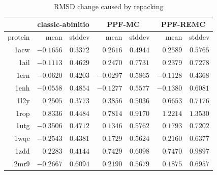\begin{table}
  \centering
  \begin{tabular}{r|r|c||r|c||r|c}
            & \multicolumn{2}{c}{classic-abinitio} & \multicolumn{2}{||c}{PPF-MC} & \multicolumn{2}{||c}{PPF-REMC} \\ \hline
    protein & mean      & stddev   & mean      & stddev   & mean      & stddev   \\ \hline \hline
    1acw    & $-0.1656$ & $0.3372$ & $0.2616$  & $0.4944$ & $0.2589$  & $0.5765$ \\ \hline
    1ail    & $-0.1113$ & $0.4629$ & $0.2470$  & $0.7731$ & $0.2379$  & $0.7278$ \\ \hline
    1crn    & $-0.0620$ & $0.4203$ & $-0.0297$ & $0.5865$ & $-0.1128$ & $0.4368$ \\ \hline
    1enh    & $-0.0558$ & $0.4854$ & $-0.1277$ & $0.5577$ & $-0.1380$ & $0.6081$ \\ \hline
    1l2y    & $0.2505$  & $0.3773$ & $0.3856$  & $0.5036$ & $0.6653$  & $0.7176$ \\ \hline
    1rop    & $0.8336$  & $0.4484$ & $0.7814$  & $0.9170$ & $1.2214$  & $1.3530$ \\ \hline
    1utg    & $-0.3506$ & $0.4712$ & $0.1346$  & $0.5762$ & $0.1793$  & $0.7202$ \\ \hline
    1wqc    & $-0.2543$ & $0.4381$ & $0.1729$  & $0.5624$ & $0.2160$  & $0.6377$ \\ \hline
    1zdd    & $0.2283$  & $0.4144$ & $0.7429$  & $0.6098$ & $0.7470$  & $0.9897$ \\ \hline
    2mr9    & $-0.2667$ & $0.6094$ & $0.2190$  & $0.5679$ & $0.1875$  & $0.6957$ \\ \hline
  \end{tabular}
  \caption{RMSD change caused by repacking}
  \label{tab:repack-impact-rmsd}
\end{table}

